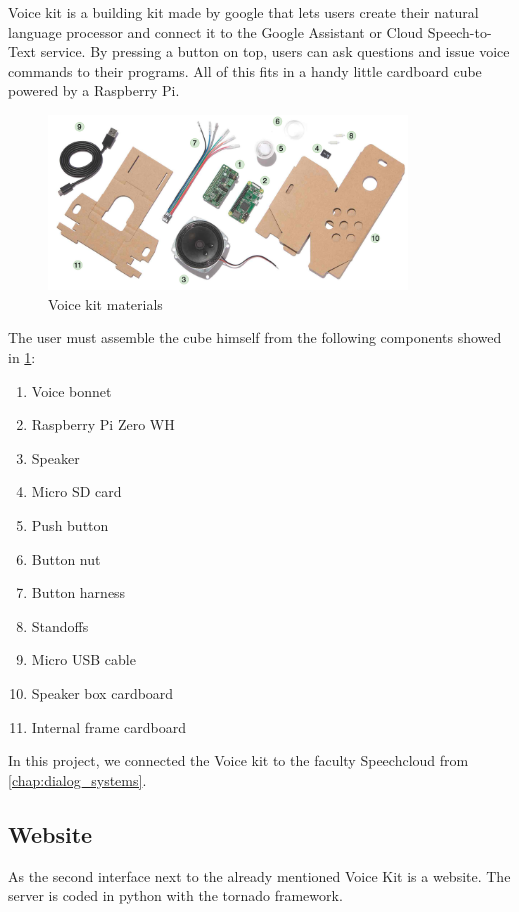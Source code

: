 Voice kit \citep{aiy_projects} is a building kit made by google that lets users create their natural language processor and connect it to the Google Assistant or Cloud Speech-to-Text service. By pressing a button on top, users can ask questions and issue voice commands to their programs. All of this fits in a handy little cardboard cube powered by a Raspberry Pi. 

\begin{figure}[H]
	\centering
	\includegraphics[width=0.85\textwidth]{img/voice_kit.png}
	\caption{Voice kit materials}
	\label{fig:voice_kit}
  \end{figure}

The user must assemble the cube himself from the following components showed in \cref{fig:voice_kit}:

\begin{enumerate}
	\item Voice bonnet
	\item Raspberry Pi Zero WH
	\item Speaker
	\item Micro SD card
	\item Push button
	\item Button nut
	\item Button harness
	\item Standoffs
	\item Micro USB cable
	\item Speaker box cardboard
	\item Internal frame cardboard
\end{enumerate}

In this project, we connected the Voice kit to the faculty Speechcloud from \cref{chap:dialog_systems}.

\subsection{Website}

As the second interface next to the already mentioned Voice Kit is a website. The server is coded in python with the tornado framework.

